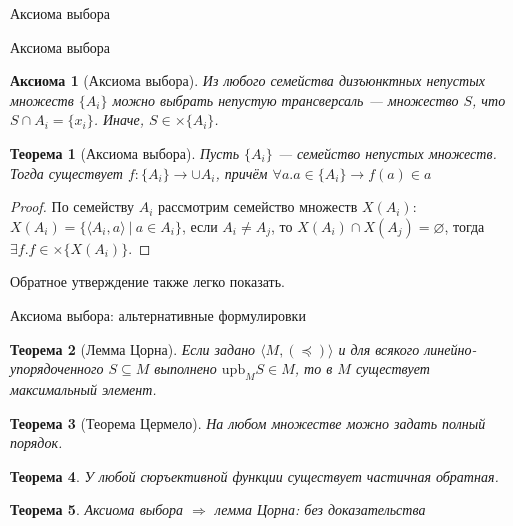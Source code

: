 \documentclass[aspectratio=169]{beamer}
\newtheorem{thm}{Теорема}[section]
\newtheorem{axm}{Аксиома}[section]
\begin{document}
\newcommand\doubleplus{+\kern-1.3ex+\kern0.8ex}
\newcommand\mdoubleplus{\ensuremath{\mathbin{+\mkern-10mu+}}}

\begin{frame}
\begin{center}\LARGE Аксиома выбора \end{center}
\end{frame}


\begin{frame}{Аксиома выбора}
\begin{axm}[Аксиома выбора]
Из любого семейства дизъюнктных непустых множеств $\{A_i\}$ можно выбрать непустую трансверсаль --- 
множество $S$, что $S \cap A_i = \{ x_i \}$. Иначе, $S \in \times \{A_i\}$.
\end{axm}

\begin{thm}[Аксиома выбора]
Пусть $\{A_i\}$ --- семейство непустых множеств. Тогда существует
$f : \{A_i\} \rightarrow \cup A_i$, причём $\forall a.a \in \{A_i\} \rightarrow f(a) \in a$
\end{thm}

\begin{proof}По семейству $A_i$ рассмотрим семейство множеств $X(A_i)$:
$X(A_i) = \{ \langle A_i, a \rangle \ |\ a \in A_i \}$, если $A_i \ne A_j$, то $X(A_i) \cap X(A_j) = \varnothing$,
тогда $\exists f.f \in \times \{ X(A_i) \}$.
\end{proof}
Обратное утверждение также легко показать.
\end{frame}

\begin{frame}{Аксиома выбора: альтернативные формулировки}
\begin{thm}[Лемма Цорна]
Если задано $\langle M, (\preceq) \rangle$ и для всякого линейно-упорядоченного $S \subseteq M$ выполнено
$\text{upb}_M S \in M$, то в $M$ существует максимальный элемент.
\end{thm}
\begin{thm}[Теорема Цермело]
На любом множестве можно задать полный порядок.
\end{thm}
\begin{thm}
У любой сюръективной функции существует частичная обратная.
\end{thm}

\begin{thm}
Аксиома выбора $\Rightarrow$ лемма Цорна: без доказательства
\end{thm}
\end{frame}
\end{document}
